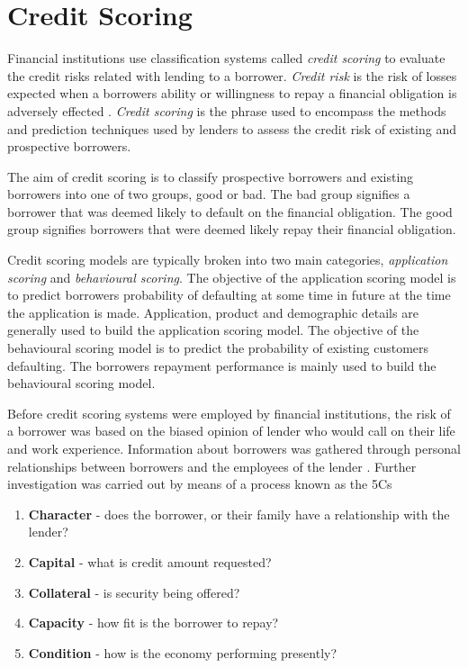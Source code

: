 \section{Credit Scoring}

Financial institutions use classification systems called \textit{credit scoring} to evaluate the credit risks related with lending to a borrower. \textit{Credit risk} is the risk of losses expected when a borrowers ability or willingness to repay a financial obligation is adversely effected \citep{anderson_credit_2007}. \textit{Credit scoring} is the phrase used to encompass the methods and prediction techniques used by lenders to assess the credit risk of existing and prospective borrowers. 

The aim of credit scoring is to classify prospective borrowers and existing borrowers into one of two groups, good or bad. The bad group signifies a borrower that was deemed likely to default on the financial obligation. The good group signifies borrowers that were deemed likely repay their financial obligation.

Credit scoring models are typically broken into two main categories, \textit{application scoring} and \textit{behavioural scoring}. The objective of the application scoring model is to predict borrowers probability of defaulting at some time in future at the time the application is made. Application, product and demographic details are generally used to build the application scoring model. The objective of the behavioural scoring model is to predict the probability of existing customers defaulting. The borrowers repayment performance is mainly used to build the behavioural scoring model. 

Before credit scoring systems were employed by financial institutions, the risk of a borrower was based on the biased opinion of lender who would call on their life and work experience. Information about borrowers was gathered through personal relationships between borrowers and the employees of the lender \citep{anderson_credit_2007}. Further investigation was carried out by means of a process known as the 5Cs

\begin{enumerate}
	\renewcommand{\labelenumi}{(\roman{enumi})}  
	\item \textbf{Character} - does the borrower, or their family have a relationship with the lender?
	\item \textbf{Capital} - what is credit amount requested?
	\item \textbf{Collateral} - is security being offered?
	\item \textbf{Capacity} - how fit is the borrower to repay?
	\item \textbf{Condition} - how is the economy performing presently?
\end{enumerate}

